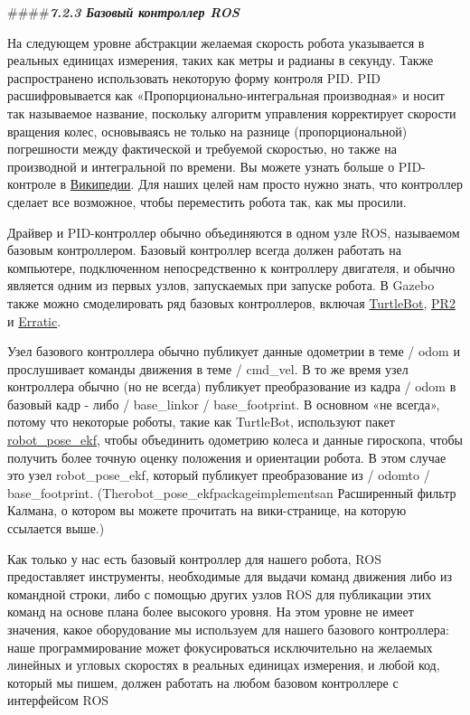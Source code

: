 ####\textit{\textbf{7.2.3 Базовый контроллер ROS}}

На следующем уровне абстракции желаемая скорость робота указывается в реальных единицах измерения, таких как метры и радианы в секунду. Также распространено использовать некоторую форму контроля PID. PID расшифровывается как «Пропорционально-интегральная производная» и носит так называемое название, поскольку алгоритм управления корректирует скорости вращения колес, основываясь не только на разнице (пропорциональной) погрешности между фактической и требуемой скоростью, но также на производной и интегральной по времени. Вы можете узнать больше о PID-контроле в \href{http://en.wikipedia.org/wiki/PID_controller}{Википедии}. Для наших целей нам просто нужно знать, что контроллер сделает все возможное, чтобы переместить робота так, как мы просили. 

Драйвер и PID-контроллер обычно объединяются в одном узле ROS, называемом базовым контроллером. Базовый контроллер всегда должен работать на компьютере, подключенном непосредственно к контроллеру двигателя, и обычно является одним из первых узлов, запускаемых при запуске робота. В Gazebo также можно смоделировать ряд базовых контроллеров, включая \href{http://wiki.ros.org/turtlebot_simulator}{TurtleBot}, \href{http://wiki.ros.org/pr2_simulator/Tutorials}{PR2} и \href{http://wiki.ros.org/erratic_robot}{Erratic}.

Узел базового контроллера обычно публикует данные одометрии в теме / odom и прослушивает команды движения в теме / cmd\_vel. В то же время узел контроллера обычно (но не всегда) публикует преобразование из кадра / odom в базовый кадр - либо / base\_linkor / base\_footprint. В основном «не всегда», потому что некоторые роботы, такие как TurtleBot, используют пакет \href{http://ros.org/wiki/robot_pose_ekf}{robot\_pose\_ekf}, чтобы объединить одометрию колеса и данные гироскопа, чтобы получить более точную оценку положения и ориентации робота. В этом случае это узел robot\_pose\_ekf, который публикует преобразование из / odomto / base\_footprint. (Therobot\_pose\_ekfpackageimplementsan Расширенный фильтр Калмана, о котором вы можете прочитать на вики-странице, на которую ссылается выше.) 

Как только у нас есть базовый контроллер для нашего робота, ROS предоставляет инструменты, необходимые для выдачи команд движения либо из командной строки, либо с помощью других узлов ROS для публикации этих команд на основе плана более высокого уровня. На этом уровне не имеет значения, какое оборудование мы используем для нашего базового контроллера: наше программирование может фокусироваться исключительно на желаемых линейных и угловых скоростях в реальных единицах измерения, и любой код, который мы пишем, должен работать на любом базовом контроллере с интерфейсом ROS 

